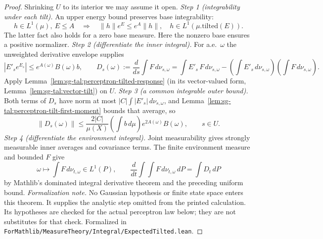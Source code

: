 \begin{proof}
  \leanok
Shrinking $U$ to its interior we may assume it open.
\emph{Step 1 (integrability under each tilt).} An upper energy bound preserves base integrability:
\[
 h\in L^1(\mu),\ E\le A
 \quad\Longrightarrow\quad \|h\|e^E\le e^A\|h\|,
 \quad h\in L^1(\mu.\mathrm{tilted}(E)).
\]
The latter fact also holds for a zero base measure. Here the nonzero base ensures a positive normalizer.
\emph{Step 2 (differentiate the inner integral).} For a.e.\ $\omega$ the unweighted derivative envelope supplies
\[
 |E'_s e^{E_s}|\le e^{A(\omega)}B(\omega)b,
 \qquad
 D_s(\omega):=\frac d{ds}\int F\,d\nu_{s,\omega}
 =\int E'_s\,F\,d\nu_{s,\omega}
  -\left(\int E'_s\,d\nu_{s,\omega}\right)\left(\int F\,d\nu_{s,\omega}\right).
\]
Apply Lemma~\ref{lem:sg-tal:perceptron-tilted-response} (in its vector-valued form,
Lemma~\ref{lem:sg-tal:vector-tilt}) on $U$.
\emph{Step 3 (a common integrable outer bound).} Both terms of $D_s$ have norm at most
$|C|\int|E'_s|\,d\nu_{s,\omega}$, and Lemma~\ref{lem:sg-tal:perceptron-tilt-first-moment} bounds that average, so
\[
 \|D_s(\omega)\|
 \le\frac{2|C|}{\mu(X)}\left(\int b\,d\mu\right)e^{2A(\omega)}B(\omega),
 \qquad s\in U.
\]
\emph{Step 4 (differentiate the environment integral).} Joint measurability gives strongly measurable
inner averages and covariance terms. The finite environment measure and bounded $F$ give
\[
 \omega\longmapsto\int F\,d\nu_{t,\omega}\in L^1(P),
 \qquad
 \frac d{dt}\int\!\int F\,d\nu_{t,\omega}\,dP=\int D_t\,dP
\]
by Mathlib's dominated integral derivative theorem and the preceding uniform bound.
\emph{Formalization note.} No Gaussian hypothesis or finite state space enters this theorem.
It supplies the analytic step omitted from the printed calculation. Its hypotheses are
checked for the actual perceptron law below; they are not substitutes for that check.
Formalized in \texttt{ForMathlib/MeasureTheory/Integral/ExpectedTilted.lean}.
\end{proof}

